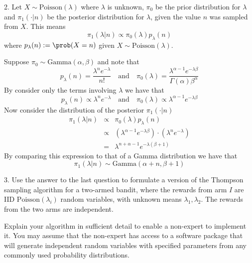 \documentclass[11pt,a4paper]{article}
\begin{document}
\begin{answer}{2.}
  Let $X\sim\text{Poisson}(\lambda)$ where $\lambda$ is unknown, $\pi_0$ be the prior distribution for $\lambda$ and $\pi_1(\cdot|n)$ be the posterior distribution for $\lambda$, given the value $n$ was sampled from $X$. This means
  \[ \pi_1(\lambda|n)\propto\pi_0(\lambda)p_\lambda(n) \]
  where $p_\lambda(n):=\prob(X=n)$ given $X\sim\text{Poisson}(\lambda)$.
  \par Suppose $\pi_0\sim\text{Gamma}(\alpha,\beta)$ and note that
  \[ p_\lambda(n)=\frac{\lambda^ne^{-\lambda}}{n!}\quad\text{and}\quad \pi_0(\lambda)=\frac{\lambda^{\alpha-1}e^{-\lambda\beta}}{\Gamma(\alpha)\beta^\alpha} \]
  By consider only the terms involving $\lambda$ we have that
  \[ p_\lambda(n)\propto\lambda^ne^{-\lambda}\quad\text{and}\quad \pi_0(\lambda)\propto\lambda^{\alpha-1}e^{-\lambda\beta} \]
  Now consider the distribution of the posterior $\pi_1(\cdot|n)$
  \[\begin{array}{rcl}
      \pi_1(\lambda|n)&\propto&\pi_0(\lambda)p_\lambda(n)\\
      &\propto&\left(\lambda^{\alpha-1}e^{-\lambda\beta}\right)\cdot\left(\lambda^ne^{-\lambda}\right)\\
      &=&\lambda^{n+\alpha-1}e^{-\lambda(\beta+1)}
  \end{array}\]
  By comparing this expression to that of a Gamma distribution we have that
  \[ \pi_1(\lambda|n)\sim\text{Gamma}(\alpha+n,\beta+1) \]
\end{answer}

\begin{question}{3.}
  Use the answer to the last question to formulate a version of the Thompson sampling algorithm for a two-armed bandit, where the rewards from arm $I$ are IID $\text{Poisson}(\lambda_i)$ random variables, with unknown means $\lambda_1,\lambda_2$. The rewards from the two arms are independent.
  \par Explain your algorithm in sufficient detail to enable a non-expert to implement it. You may assume that the non-expert has access to a software package that will generate independent random variables with specified parameters from any commonly used probability distributions.
\end{question}
\end{document}
